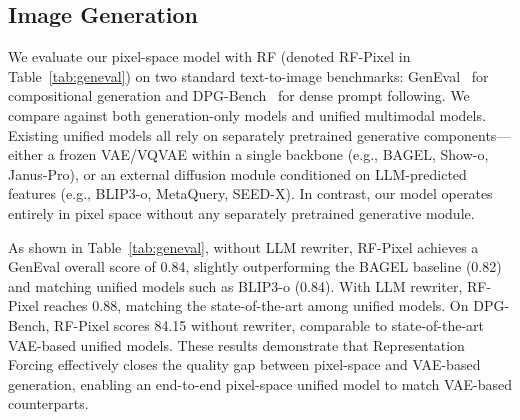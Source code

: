 \subsection{Image Generation}
\label{sec:t2i}



We evaluate our pixel-space model with RF (denoted RF-Pixel in Table~\ref{tab:geneval}) on two standard text-to-image benchmarks: GenEval~\cite{geneval} for compositional generation and DPG-Bench~\cite{dpg} for dense prompt following. We compare against both generation-only models and unified multimodal models. Existing unified models all rely on separately pretrained generative components—either a frozen VAE/VQVAE within a single backbone (e.g., BAGEL, Show-o, Janus-Pro), or an external diffusion module conditioned on LLM-predicted features (e.g., BLIP3-o, MetaQuery, SEED-X). In contrast, our model operates entirely in pixel space without any separately pretrained generative module.


As shown in Table~\ref{tab:geneval}, without LLM rewriter, RF-Pixel achieves a GenEval overall score of 0.84, slightly outperforming the BAGEL baseline (0.82) and matching unified models such as BLIP3-o (0.84). With LLM rewriter, RF-Pixel reaches 0.88, matching the state-of-the-art among unified models. On DPG-Bench, RF-Pixel scores 84.15 without rewriter, comparable to state-of-the-art VAE-based unified models. These results demonstrate that Representation Forcing effectively closes the quality gap between pixel-space and VAE-based generation, enabling an end-to-end pixel-space unified model to match VAE-based counterparts.



